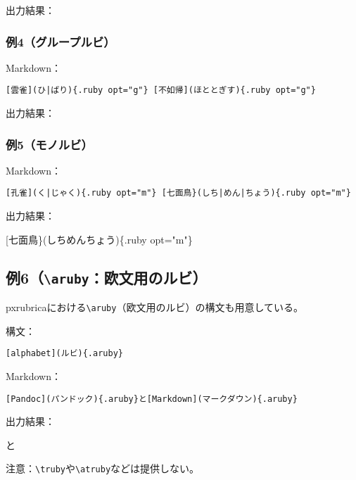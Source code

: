 \documentclass[
  a4paper,
  lualatex,
  ja=standard]{bxjsarticle}
\begin{document}
出力結果：

{}

\hypertarget{ux4f8b4ux30b0ux30ebux30fcux30d7ux30ebux30d3}{%
\subsubsection{例4（グループルビ）}\label{ux4f8b4ux30b0ux30ebux30fcux30d7ux30ebux30d3}}

Markdown：

\begin{verbatim}
[雲雀](ひ|ばり){.ruby opt="g"} [不如帰](ほととぎす){.ruby opt="g"}
\end{verbatim}

出力結果：

{} {}

\hypertarget{ux4f8b5ux30e2ux30ceux30ebux30d3}{%
\subsubsection{例5（モノルビ）}\label{ux4f8b5ux30e2ux30ceux30ebux30d3}}

Markdown：

\begin{verbatim}
[孔雀](く|じゃく){.ruby opt="m"} [七面鳥}(しち|めん|ちょう){.ruby opt="m"}
\end{verbatim}

出力結果：

{}
{[}七面鳥\}(しち\textbar めん\textbar ちょう)\{.ruby opt="m"\}

\hypertarget{ux4f8b6arubyux6b27ux6587ux7528ux306eux30ebux30d3}{%
\subsection{\texorpdfstring{例6（\texttt{\textbackslash{}aruby}：欧文用のルビ）}{例6（\textbackslash aruby：欧文用のルビ）}}\label{ux4f8b6arubyux6b27ux6587ux7528ux306eux30ebux30d3}}

pxrubricaにおける\texttt{\textbackslash{}aruby}（欧文用のルビ）の構文も用意している。

構文：

\begin{verbatim}
[alphabet](ルビ){.aruby}
\end{verbatim}

Markdown：

\begin{verbatim}
[Pandoc](パンドック){.aruby}と[Markdown](マークダウン){.aruby}
\end{verbatim}

出力結果：

{}と{}

注意：\texttt{\textbackslash{}truby}や\texttt{\textbackslash{}atruby}などは提供しない。
\end{document}
